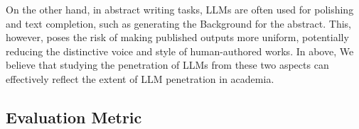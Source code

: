 On the other hand, in abstract writing tasks, LLMs are often used for polishing and text completion\cite{khalifa2024using}, such as generating the Background for the abstract. This, however, poses the risk of making published outputs more uniform, potentially reducing the distinctive voice and style of human-authored works. In above, We believe that studying the penetration of LLMs from these two aspects can effectively reflect the extent of LLM penetration in academia.




\subsection{Evaluation Metric}



